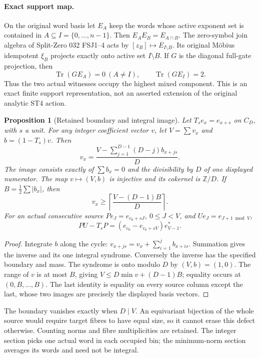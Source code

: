 \documentclass[10pt]{article}
\newtheorem{proposition}[theorem]{Proposition}
\begin{document}
\paragraph{Exact support map.}
On the original word basis let $E_A$ keep the words whose active exponent
set is contained in $A\subseteq I=\{0,\ldots,n-1\}$. Then
$E_AE_B=E_{A\cap B}$. The zero-symbol join algebra of Split-Zero 032 FSJ1--4
acts by $[z_B]\mapsto E_{I\setminus B}$. Its original M\"obius idempotent
$\xi_B$ projects exactly onto active set $I\setminus B$. If $G$ is the
diagonal full-gate projection, then
\[
 \operatorname{Tr}(GE_A)=0\ (A\ne I),\qquad\operatorname{Tr}(GE_I)=2.
\]
Thus the two actual witnesses occupy the highest mixed component. This is
an exact finite support representation, not an asserted extension of the
original analytic ST4 action.

\begin{proposition}[Retained boundary and integral image]
Let $T_se_x=e_{x+s}$ on $C_D$, with $s$ a unit. For any integer coefficient
vector $v$, let $V=\sum v_x$ and $b=(1-T_s)v$. Then
\[
 v_x=\frac{V-\sum_{j=1}^{D-1}(D-j)b_{x+js}}D.
\]
The image consists exactly of $\sum b_x=0$ and the divisibility by $D$ of
one displayed numerator. The map $v\mapsto(V,b)$ is injective and its
cokernel is $\mathbb Z/D$. If $B=\frac12\sum|b_x|$, then
\[
 v_x\ge\left\lceil\frac{V-(D-1)B}{D}\right\rceil.
\]
For an actual consecutive source $P e_J=e_{c_0+sJ}$, $0\le J<V$, and
$Ue_J=e_{J+1\bmod V}$,
\[
 PU-T_sP=(e_{c_0}-e_{c_0+sV})e_{V-1}^*.
\]
\end{proposition}
\begin{proof}
Integrate $b$ along the cycle: $v_{x+js}=v_x+\sum_{i=1}^jb_{x+is}$.
Summation gives the inverse and its one integral syndrome. Conversely the
inverse has the specified boundary and mass. The syndrome is onto modulo
$D$ by $(V,b)=(1,0)$. The range of $v$ is at most $B$, giving
$V\le D\min v+(D-1)B$; equality occurs at $(0,B,\ldots,B)$.
The last identity is equality on every source column except the last,
whose two images are precisely the displayed basis vectors.
\end{proof}
The boundary vanishes exactly when $D\mid V$. An equivariant bijection of
the whole source would require target fibres to have equal size, so it
cannot erase this defect otherwise. Counting norms and fibre multiplicities
are retained. The integer section picks one actual word in each occupied
bin; the minimum-norm section averages its words and need not be integral.
\end{document}
